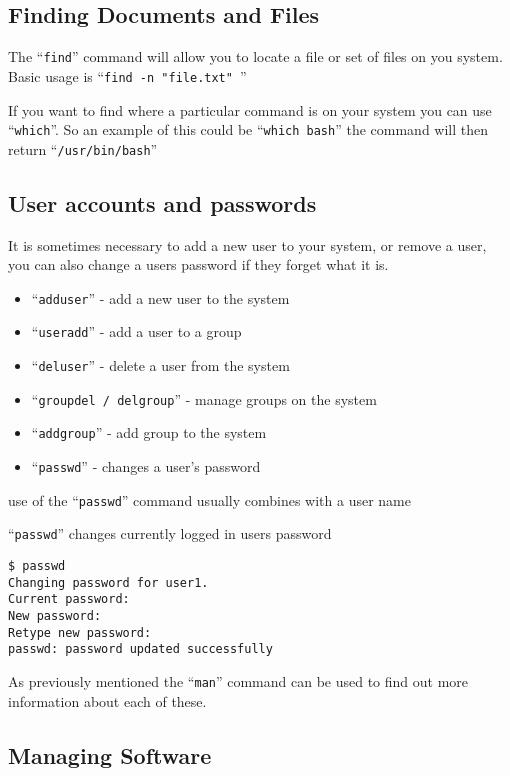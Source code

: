 \documentclass{extbook}
\begin{document}
\subsection{Finding Documents and Files}

The ``\verb|find|'' command will allow you to locate a file or set of files on you system. Basic usage is ``\verb|find -n "file.txt" |''

If you want to find where a particular command is on your system you can use ``\verb|which|''. So an example of this could be ``\verb|which bash|'' the command will then return ``\verb|/usr/bin/bash|''

\subsection{User accounts and passwords}

It is sometimes necessary to add a new user to your system, or remove a user, you can also change a users password if they forget what it is.

\begin{itemize}
\item ``\verb|adduser|'' - add a new user to the system
\item ``\verb|useradd|'' - add a user to a group
\item ``\verb|deluser|'' - delete a user from the system
\item ``\verb|groupdel / delgroup|'' - manage groups on the system
\item ``\verb|addgroup|'' - add group to the system
\item ``\verb|passwd|'' - changes a user's password
\end{itemize}

use of the ``\verb|passwd|'' command usually combines with a user name

``\verb|passwd|'' changes currently logged in users password

\begin{verbatim}
$ passwd
Changing password for user1.
Current password:
New password:
Retype new password:
passwd: password updated successfully
\end{verbatim}

As previously mentioned the ``\verb|man|'' command can be used to find out more information about each of these.

\subsection{Managing Software}
\end{document}
